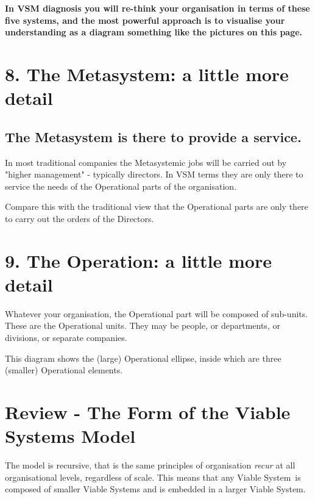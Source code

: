 \textbf{In VSM diagnosis you will re-think your organisation in terms of these five systems, and the most powerful approach is to visualise your understanding as a diagram something like the pictures on this page.}

\section*{8. The Metasystem: a little more detail}

\subsection*{The Metasystem is there to provide a service.}
In most traditional companies the Metasystemic jobs will be carried out by "higher management" - typically directors. In VSM terms they are only there to service the needs of the Operational parts of the organisation.

Compare this with the traditional view that the Operational parts are only there to carry out the orders of the Directors.

\section*{9. The Operation: a little more detail}
Whatever your organisation, the Operational part will be composed of sub-units. These are the Operational units. They may be people, or departments, or divisions, or separate companies.

This diagram shows the (large) Operational ellipse, inside which are three (smaller) Operational elements.


\section*{Review - The Form of the Viable Systems Model}
The model is recursive, that is the same principles of organisation \textit{recur} at all organisational levels, regardless of scale. This means that any Viable System is composed of smaller Viable Systems and is embedded in a larger Viable System.

